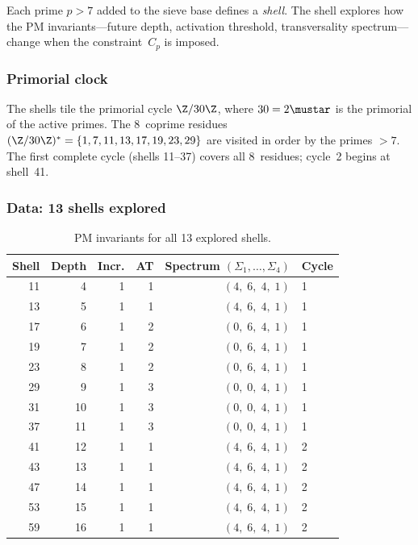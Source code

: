\documentclass[12pt,a4paper]{article}
\begin{document}
Each prime $p > 7$ added to the sieve base defines a \emph{shell}.  The
shell explores how the PM invariants---future depth, activation threshold,
transversality spectrum---change when the constraint~$C_p$ is imposed.

\subsubsection{Primorial clock}
\label{sec:PM_clock}

The shells tile the primorial cycle $\Z/30\Z$, where $30 = 2\mustar$
is the primorial of the active primes.  The 8~coprime residues
$(\Z/30\Z)^* = \{1, 7, 11, 13, 17, 19, 23, 29\}$ are visited in order
by the primes $> 7$.  The first complete cycle (shells 11--37) covers
all 8~residues; cycle~2 begins at shell~41.

\subsubsection{Data: 13 shells explored}
\label{sec:PM_data}

\begin{table}[htbp]
\centering
\caption{PM invariants for all 13 explored shells.}
\label{tab:PM_shells}
\begin{tabular}{rrrrrl}
\toprule
Shell & Depth & Incr. & AT & Spectrum $(\Sigma_1,\ldots,\Sigma_4)$ & Cycle \\
\midrule
11 &  4 & 1 & 1 & $(4,\;6,\;4,\;1)$ & 1 \\
13 &  5 & 1 & 1 & $(4,\;6,\;4,\;1)$ & 1 \\
17 &  6 & 1 & 2 & $(0,\;6,\;4,\;1)$ & 1 \\
19 &  7 & 1 & 2 & $(0,\;6,\;4,\;1)$ & 1 \\
23 &  8 & 1 & 2 & $(0,\;6,\;4,\;1)$ & 1 \\
29 &  9 & 1 & 3 & $(0,\;0,\;4,\;1)$ & 1 \\
31 & 10 & 1 & 3 & $(0,\;0,\;4,\;1)$ & 1 \\
37 & 11 & 1 & 3 & $(0,\;0,\;4,\;1)$ & 1 \\
41 & 12 & 1 & 1 & $(4,\;6,\;4,\;1)$ & 2 \\
43 & 13 & 1 & 1 & $(4,\;6,\;4,\;1)$ & 2 \\
47 & 14 & 1 & 1 & $(4,\;6,\;4,\;1)$ & 2 \\
53 & 15 & 1 & 1 & $(4,\;6,\;4,\;1)$ & 2 \\
59 & 16 & 1 & 1 & $(4,\;6,\;4,\;1)$ & 2 \\
\bottomrule
\end{tabular}
\end{table}
\end{document}
